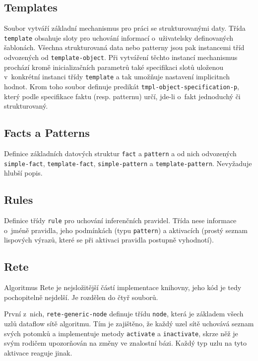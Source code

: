 \subsection{Templates}
Soubor vytváří základní mechanismus pro práci se strukturovanými daty.
Třída \verb|template| obsahuje sloty pro uchování informací o~uživatelsky
definovaných šablonách. Všechna strukturovaná data nebo patterny jsou pak
instancemi tříd odvozených od \verb|template-object|. Při vytváření těchto
instancí mechanismus prochází kromě inicializačních parametrů také specifikaci
slotů uloženou v~konkrétní instanci třídy \verb|template| a tak umožňuje
nastavení implicitnch hodnot. Krom toho soubor definuje predikát
\verb|tmpl-object-specification-p|, který podle specifikace faktu (resp.
patternu) určí, jde-li o~fakt jednoduchý či strukturovaný.
\subsection{Facts a Patterns}
Definice základních datových struktur \verb|fact| a \verb|pattern| a od nich
odvozených \verb|simple-fact|, \verb|template-fact|, \verb|simple-pattern|
a \verb|template-pattern|. Nevyžaduje hlubší popis.
\subsection{Rules}
Definice třídy \verb|rule| pro uchování inferenčních pravidel. Třída nese
informace o~jméně pravidla, jeho podmínkách (typu \verb|pattern|) a aktivacích
(prostý seznam lispových výrazů, které se při aktivaci pravidla postupně
vyhodnotí).
\subsection{Rete}
Algoritmus Rete je nejsložitější částí implementace knihovny, jeho kód je tedy
pochopitelně nejdelší. Je rozdělen do čtyř souborů.

První z~nich, \verb|rete-generic-node| definuje třídu \verb|node|, která je
základem všech uzlů dataflow sítě algoritmu. Tím je zajištěno, že každý uzel
sítě uchovává seznam svých potomků a implementuje metody \verb|activate|
a \verb|inactivate|, skrze něž je svým rodičem upozorňován na změny ve znalostní
bázi. Každý typ uzlu na tyto aktivace reaguje jinak.

